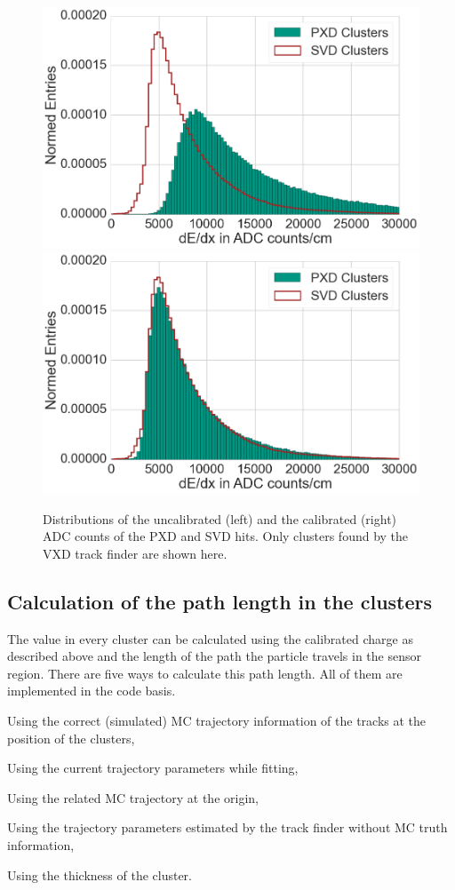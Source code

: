 \begin{figure}
  \centering
 \includegraphics[width=0.48\linewidth]{figures/vxd/dEdXUncalibrated.png}
 \includegraphics[width=0.48\linewidth]{figures/vxd/dEdXCalibrated.png}
 \caption[Distributions of the uncalibrated and the calibrated ADC counts.]{Distributions of the uncalibrated (left) and the calibrated (right) ADC counts of the PXD and SVD hits. Only clusters found by the VXD track finder are shown here.}
 \label{fig-adc-count}
\end{figure}

\subsection{Calculation of the path length in the clusters} \label{subsection-calc}
The \dedx value in every cluster can be calculated using the calibrated charge as described above and the length of the path the particle travels in the sensor region. There are five ways to calculate this path length. All of them are implemented in the code basis.
\begin{zlist}
 \item Using the correct (simulated) MC trajectory information of the tracks at the position of the clusters, \label{list-mc}
 \item Using the current trajectory parameters while fitting,
 \item Using the related MC trajectory at the origin,
 \item Using the trajectory parameters estimated by the track finder without MC truth information,
 \item Using the thickness of the cluster.
\end{zlist}


